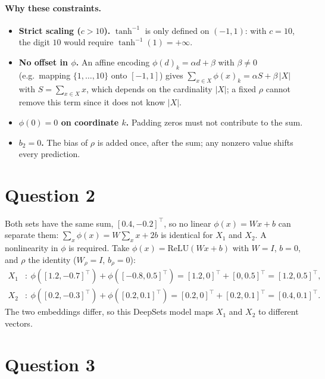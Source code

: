 \documentclass[a4paper]{article}
\begin{document}
\paragraph{Why these constraints.}
\begin{itemize}
    \item \textbf{Strict scaling ($c > 10$).} $\tanh^{-1}$ is only defined on $(-1, 1)$: with $c = 10$, the digit $10$ would require $\tanh^{-1}(1) = +\infty$.
    \item \textbf{No offset in $\phi$.} An affine encoding $\phi(d)_k = \alpha d + \beta$ with $\beta \neq 0$ (e.g.\ mapping $\{1, \dots, 10\}$ onto $[-1, 1]$) gives $\sum_{x \in X} \phi(x)_k = \alpha S + \beta\, |X|$ with $S = \sum_{x \in X} x$, which depends on the cardinality $|X|$; a fixed $\rho$ cannot remove this term since it does not know $|X|$.
    \item \textbf{$\phi(0) = 0$ on coordinate $k$.} Padding zeros must not contribute to the sum.
    \item \textbf{$b_2 = 0$.} The bias of $\rho$ is added once, after the sum; any nonzero value shifts every prediction.
\end{itemize}

\section{Question 2}

Both sets have the same sum, $[0.4, -0.2]^\top$, so no linear $\phi(x) = Wx + b$ can separate them: $\sum_{x} \phi(x) = W \sum_x x + 2b$ is identical for $X_1$ and $X_2$. A nonlinearity in $\phi$ is required. Take $\phi(x) = \mathrm{ReLU}(Wx + b)$ with $W = I$, $b = 0$, and $\rho$ the identity ($W_\rho = I$, $b_\rho = 0$):
\begin{align}
    X_1 &: \ \phi([1.2, -0.7]^\top) + \phi([-0.8, 0.5]^\top) = [1.2, 0]^\top + [0, 0.5]^\top = [1.2, 0.5]^\top, \\
    X_2 &: \ \phi([0.2, -0.3]^\top) + \phi([0.2, 0.1]^\top) = [0.2, 0]^\top + [0.2, 0.1]^\top = [0.4, 0.1]^\top .
\end{align}
The two embeddings differ, so this DeepSets model maps $X_1$ and $X_2$ to different vectors.


\section{Question 3}
\end{document}
